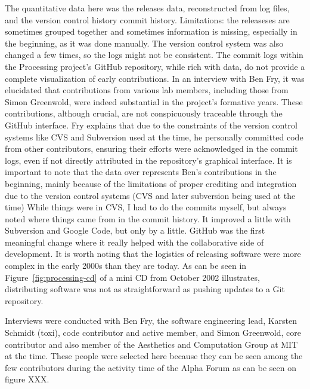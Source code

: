 The quantitative data here was the releases data, reconstructed from log files, and the version control history commit history. Limitations: the releaseses are sometimes grouped together and sometimes information is missing, especially in the beginning, as it was done manually. The version control system was also changed a few times, so the logs might not be consistent. 
The commit logs within the Processing project's GitHub repository, while rich with data, do not provide a complete visualization of early contributions. In an interview with Ben Fry, it was elucidated that contributions from various lab members, including those from Simon Greenwold, were indeed substantial in the project's formative years. These contributions, although crucial, are not conspicuously traceable through the GitHub interface. Fry explains that due to the constraints of the version control systems like CVS and Subversion used at the time, he personally committed code from other contributors, ensuring their efforts were acknowledged in the commit logs, even if not directly attributed in the repository's graphical interface.
It is important to note that the data over represents Ben's contributions in the beginning, mainly because of the limitations of proper crediting and integration due to the version control systems (CVS and later subversion being used at the time)
While things were in CVS, I had to do the commits myself, but always noted where things came from in the commit history. It improved a little with Subversion and Google Code, but only by a little. GitHub was the first meaningful change where it really helped with the collaborative side of development. 
It is worth noting that the logistics of releasing software were more complex in the early 2000s than they are today. As can be seen in Figure~\ref{fig:processing-cd} of a mini CD from October 2002 illustrates, distributing software was not as straightforward as pushing updates to a Git repository.

Interviews were conducted with Ben Fry, the software engineering lead, Karsten Schmidt (toxi), code contributor and active member, and Simon Greenwold, core contributor and also member of the Aesthetics and Computation Group at MIT at the time. These people were selected here because they can be seen among the few contributors during the activity time of the Alpha Forum as can be seen on figure XXX. 




